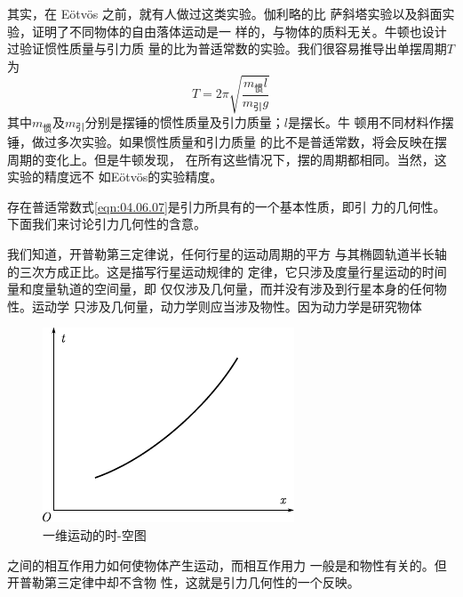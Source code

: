 其实，在 E\"otv\"os 之前，就有人做过这类实验。伽利略的比
萨斜塔实验以及斜面实验，证明了不同物体的自由落体运动是一
样的，与物体的质料无关。牛顿也设计过验证惯性质量与引力质
量的比为普适常数的实验。我们很容易推导出单摆周期$ T $为
\begin{equation*}
	T = 2 \pi \sqrt{\frac { m _ {\text{惯}} l } { m _ {\text{引}} g }}
\end{equation*}
其中$ m _ {\text{惯}} $及$ m _ {\text{引}} $分别是摆锤的惯性质量及引力质量；$ l $是摆长。牛
顿用不同材料作摆锤，做过多次实验。如果惯性质量和引力质量
的比不是普适常数，将会反映在摆周期的变化上。但是牛顿发现，
在所有这些情况下，摆的周期都相同。当然，这实验的精度远不
如E\"otv\"os的实验精度。

存在普适常数式\eqref{eqn:04.06.07}是引力所具有的一个基本性质，即引
力的几何性。下面我们来讨论引力几何性的含意。

我们知道，开普勒第三定律说，任何行星的运动周期的平方
与其椭圆轨道半长轴的三次方成正比。这是描写行星运动规律的
定律，它只涉及度量行星运动的时间量和度量轨道的空间量，即
仅仅涉及几何量，而并没有涉及到行星本身的任何物性。运动学
只涉及几何量，动力学则应当涉及物性。因为动力学是研究物体
\begin{figure}
	\centering
	\includegraphics{figure/fig04.06}
	\caption{一维运动的时-空图}
	\label{fig:04.06}
\end{figure}
之间的相互作用力如何使物体产生运动，而相互作用力
一般是和物性有关的。但开普勒第三定律中却不含物
性，这就是引力几何性的一个反映。

